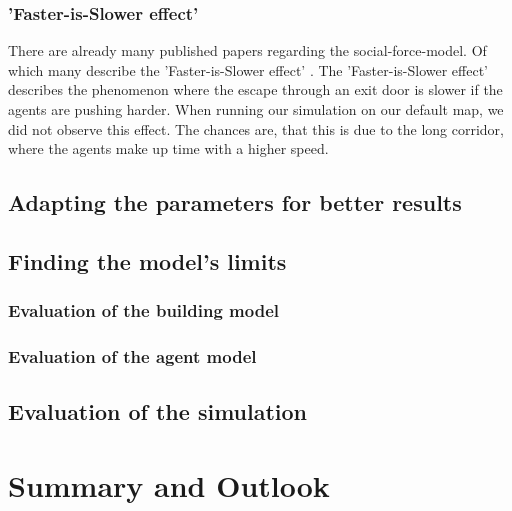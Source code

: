 \documentclass[11pt]{article}
\begin{document}
\subsubsection{'Faster-is-Slower effect'}%
There are already many published papers regarding the social-force-model. Of which many describe the 'Faster-is-Slower effect' \cite{Helbing, Wang}. The 'Faster-is-Slower effect' describes the phenomenon where the escape through an exit door is slower if the agents are pushing harder. When running our simulation on our default map, we did not observe this effect. The chances are, that this is due to the long corridor, where the agents make up time with a higher speed.

\subsection{Adapting the parameters for better results}

\subsection{Finding the model's limits}

\subsubsection{Evaluation of the building model}
\subsubsection{Evaluation of the agent model}

\subsection{Evaluation of the simulation}

\section{Summary and Outlook}





\end{document}
